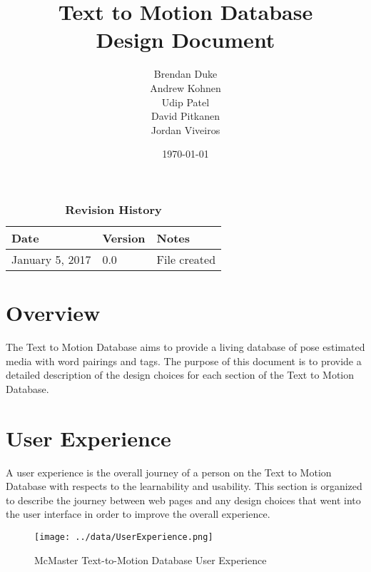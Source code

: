\documentclass{scrreprt}
\begin{document}
\title{\bf Text to Motion Database\\[\baselineskip]\Large Design Document}
\author{Brendan Duke\\Andrew Kohnen\\Udip Patel\\David Pitkanen\\Jordan Viveiros}
\date{\today}
	
\maketitle

\tableofcontents


\begin{table}[bp]
\caption*{\bf Revision History}
\begin{tabularx}{\textwidth}{p{3.5cm}p{2cm}X}
\toprule {\bf Date} & {\bf Version} & {\bf Notes}\\
\midrule
January 5, 2017 & 0.0 & File created\\
\bottomrule
\end{tabularx}
\end{table}

\newpage


\chapter{Overview}
The Text to Motion Database aims to provide a living database of pose estimated media with word pairings and tags. The purpose of this document is to provide a detailed description of the design choices for each section of the Text to Motion Database. 

\chapter{User Experience}
A user experience is the overall journey of a person on the Text to Motion Database with respects to the learnability and usability. This section is organized to describe the journey between web pages and any design choices that went into the user interface in order to improve the overall experience.

\begin{figure}[!ht]
        \caption{McMaster Text-to-Motion Database User Experience}
        \label{userExp}
        \centering
        \texttt{[image: ../data/UserExperience.png]}
\end{figure}
\end{document}
